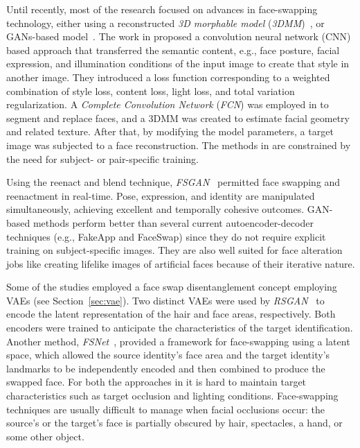 \documentclass[sn-mathphys,Numbered]{sn-jnl}
\theoremstyle{thmstyleone}%
\theoremstyle{thmstyletwo}%
\theoremstyle{thmstylethree}%
\begin{document}
Until recently, most of the research focused on advances in face-swapping technology, either using a reconstructed \emph{3D morphable model} (\emph{3DMM})~\cite{irina,nirkin}, or GANs-based model~\cite{fsgan}. The work in \cite{irina} proposed a convolution neural network (CNN) based approach that transferred the semantic content, e.g., face posture, facial expression, and illumination conditions of the input image to create that style in another image. They introduced a loss function corresponding to a weighted combination of style loss, content loss, light loss, and total variation regularization.  A \emph{Complete Convolution Network} (\emph{FCN}) was employed in \cite{nirkin} to segment and replace faces, and a 3DMM was created to estimate facial geometry and related texture. After that, by modifying the model parameters, a target image was subjected to a face reconstruction. The methods in \cite{irina,nirkin} are constrained by the need for subject- or pair-specific training.


Using the reenact and blend technique, \emph{FSGAN}~\cite{fsgan} permitted face swapping and reenactment in real-time. Pose, expression, and identity are manipulated simultaneously, achieving excellent and temporally cohesive outcomes.  GAN-based methods  perform better than several current autoencoder-decoder techniques (e.g., FakeApp and FaceSwap) since they do not require explicit training on subject-specific images. They are also well suited for face alteration jobs like creating lifelike images of artificial faces because of their iterative nature.


Some of the studies employed a face swap disentanglement concept employing VAEs (see Section~\ref{sec:vae}). Two distinct VAEs were used by \emph{RSGAN}~\cite{rsgan} to encode the latent representation of the hair and face areas, respectively. Both encoders were trained to anticipate the characteristics of the target identification. Another method, \emph{FSNet}~\cite{fsnet}, provided a framework for face-swapping using a latent space, which allowed the source identity's face area and the target identity's landmarks to be independently encoded and then combined to produce the swapped face. For both the approaches in \cite{rsgan,fsnet} it is hard to maintain target characteristics such as target occlusion and lighting conditions. Face-swapping techniques are usually difficult to manage when facial occlusions occur: the source's or the target's face is partially obscured by hair, spectacles, a hand, or some other object.
\end{document}
